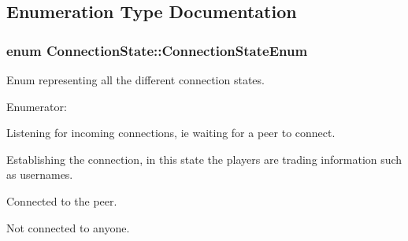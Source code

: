 \subsection{Enumeration Type Documentation}
\hypertarget{namespaceConnectionState_ad1b6674b6f1c58f17e9db75d0a77149f}{
\subsubsection[{ConnectionStateEnum}]{\setlength{\rightskip}{0pt plus 5cm}enum {\bf ConnectionState::ConnectionStateEnum}}}
\label{namespaceConnectionState_ad1b6674b6f1c58f17e9db75d0a77149f}


Enum representing all the different connection states. 

\begin{Desc}
\item[Enumerator: ]\par
\begin{description}
\item[{\em 
\hypertarget{namespaceConnectionState_ad1b6674b6f1c58f17e9db75d0a77149fa29532bebee105202d6575b23b3fb8df6}{
LISTENING}
\label{namespaceConnectionState_ad1b6674b6f1c58f17e9db75d0a77149fa29532bebee105202d6575b23b3fb8df6}
}]Listening for incoming connections, ie waiting for a peer to connect. \item[{\em 
\hypertarget{namespaceConnectionState_ad1b6674b6f1c58f17e9db75d0a77149fa3be514d893d22241ee8bd05f1f128641}{
ESTABLISHING}
\label{namespaceConnectionState_ad1b6674b6f1c58f17e9db75d0a77149fa3be514d893d22241ee8bd05f1f128641}
}]Establishing the connection, in this state the players are trading information such as usernames. \item[{\em 
\hypertarget{namespaceConnectionState_ad1b6674b6f1c58f17e9db75d0a77149fa9a42fe676b268943da19108e9f5cb2a2}{
CONNECTED}
\label{namespaceConnectionState_ad1b6674b6f1c58f17e9db75d0a77149fa9a42fe676b268943da19108e9f5cb2a2}
}]Connected to the peer. \item[{\em 
\hypertarget{namespaceConnectionState_ad1b6674b6f1c58f17e9db75d0a77149fa7388bea4debc0d7ee1b10fd6cc53012e}{
DISCONNECTED}
\label{namespaceConnectionState_ad1b6674b6f1c58f17e9db75d0a77149fa7388bea4debc0d7ee1b10fd6cc53012e}
}]Not connected to anyone. \end{description}
\end{Desc}




